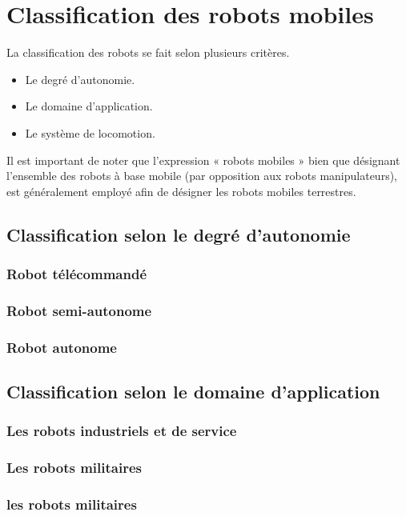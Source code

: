 \section{Classification des robots mobiles}
La classification des robots se fait selon plusieurs critères.
 \begin{itemize}    
     \item Le degré d’autonomie.     
     \item Le domaine d’application.    
      \item  Le système de locomotion. 
\end{itemize}
\newpage
Il est important de noter que l’expression « robots mobiles » bien que désignant l’ensemble des robots à base mobile (par opposition aux robots manipulateurs), est généralement employé afin de désigner les robots mobiles terrestres.
\subsection{Classification selon le degré d'autonomie}
\subsubsection{Robot télécommandé}
\subsubsection{Robot semi-autonome}
\subsubsection{Robot autonome}

\subsection{Classification selon le domaine d'application}
\subsubsection{Les robots industriels et de service}
\subsubsection{Les robots militaires}
\subsubsection{les robots militaires}
